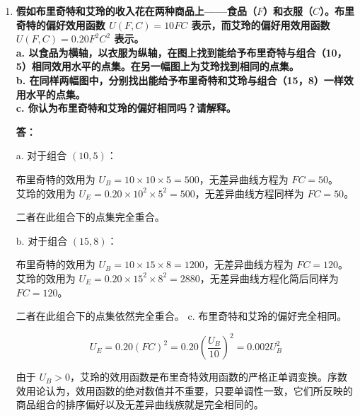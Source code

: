 \begin{enumerate}[label=\textbf{\arabic*.}, leftmargin=*]
\begin{center}
			\end{center}
			
			\item \textbf{假如布里奇特和艾玲的收入花在两种商品上——食品（$F$）和衣服（$C$）。布里奇特的偏好效用函数 $U(F, C) = 10FC$ 表示，而艾玲的偏好用效用函数 $U(F, C) = 0.20F^2C^2$ 表示。\\ a. 以食品为横轴，以衣服为纵轴，在图上找到能给予布里奇特与组合（10，5）相同效用水平的点集。在另一幅图上为艾玲找到相同的点集。\\ b. 在同样两幅图中，分别找出能给予布里奇特和艾玲与组合（15，8）一样效用水平的点集。\\ c. 你认为布里奇特和艾玲的偏好相同吗？请解释。}
			
			\textbf{答：}
			
			a. 对于组合 $(10, 5)$：
	
				布里奇特的效用为 $U_B = 10 \times 10 \times 5 = 500$，无差异曲线方程为 $FC = 50$。\\
				艾玲的效用为 $U_E = 0.20 \times 10^2 \times 5^2 = 500$，无差异曲线方程同样为 $FC = 50$。
	
			二者在此组合下的点集完全重合。
			
			b. 对于组合 $(15, 8)$：
	
				布里奇特的效用为 $U_B = 10 \times 15 \times 8 = 1200$，无差异曲线方程为 $FC = 120$。\\
				艾玲的效用为 $U_E = 0.20 \times 15^2 \times 8^2 = 2880$，无差异曲线方程化简后同样为 $FC = 120$。
	
			二者在此组合下的点集依然完全重合。
			\newpage
			c. 布里奇特和艾玲的偏好完全相同。
	
				$$U_E = 0.20(FC)^2 = 0.20 \left(\frac{U_B}{10}\right)^2 = 0.002 U_B^2$$
	
			由于 $U_B > 0$，艾玲的效用函数是布里奇特效用函数的严格正单调变换。序数效用论认为，效用函数的绝对数值并不重要，只要单调性一致，它们所反映的商品组合的排序偏好以及无差异曲线族就是完全相同的。
			

\end{enumerate}

